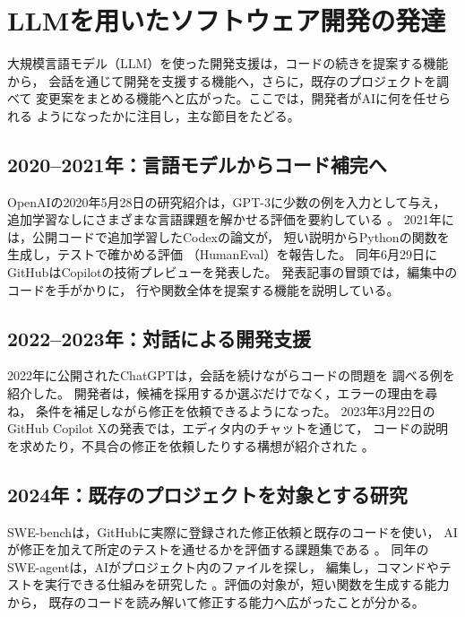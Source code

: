 \documentclass[platex]{jlreq}
\begin{document}
\section{LLMを用いたソフトウェア開発の発達}

大規模言語モデル（LLM）を使った開発支援は，コードの続きを提案する機能から，
会話を通じて開発を支援する機能へ，さらに，既存のプロジェクトを調べて
変更案をまとめる機能へと広がった。ここでは，開発者がAIに何を任せられる
ようになったかに注目し，主な節目をたどる。

\subsection{2020--2021年：言語モデルからコード補完へ}

OpenAIの2020年5月28日の研究紹介は，GPT-3に少数の例を入力として与え，
追加学習なしにさまざまな言語課題を解かせる評価を要約している
\cite{openai2020gpt3}。
2021年には，公開コードで追加学習したCodexの論文が，
短い説明からPythonの関数を生成し，テストで確かめる評価
（HumanEval）を報告した\cite{chen2021codex}。
同年6月29日にGitHubはCopilotの技術プレビューを発表した。
発表記事の冒頭では，編集中のコードを手がかりに，
行や関数全体を提案する機能を説明している\cite{github2021copilot}。

\subsection{2022--2023年：対話による開発支援}

2022年に公開されたChatGPTは，会話を続けながらコードの問題を
調べる例を紹介した\cite{openai2022chatgpt}。
開発者は，候補を採用するか選ぶだけでなく，エラーの理由を尋ね，
条件を補足しながら修正を依頼できるようになった。
2023年3月22日のGitHub Copilot Xの発表では，エディタ内のチャットを通じて，
コードの説明を求めたり，不具合の修正を依頼したりする構想が紹介された
\cite{github2023copilotx}。

\subsection{2024年：既存のプロジェクトを対象とする研究}

SWE-benchは，GitHubに実際に登録された修正依頼と既存のコードを使い，
AIが修正を加えて所定のテストを通せるかを評価する課題集である
\cite{jimenez2024swebench}。
同年のSWE-agentは，AIがプロジェクト内のファイルを探し，
編集し，コマンドやテストを実行できる仕組みを研究した
\cite{yang2024sweagent}。評価の対象が，短い関数を生成する能力から，
既存のコードを読み解いて修正する能力へ広がったことが分かる。
\end{document}

